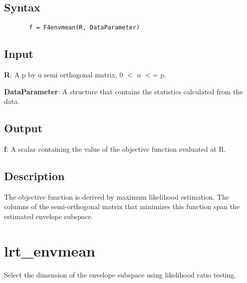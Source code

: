\documentclass[a4paper,11pt,openany]{memoir}
\begin{document}
\subsection*{Syntax}


\begin{verbatim}       f = F4envmean(R, DataParameter)\end{verbatim}
    

\subsection*{Input}

\begin{par}
\textbf{R}: A p by u semi orthogonal matrix, 0 \ensuremath{<} u \ensuremath{<}= p.
\end{par} \vspace{1em}
\begin{par}
\textbf{DataParameter}: A structure that contains the statistics calculated from the data.
\end{par} \vspace{1em}


\subsection*{Output}

\begin{par}
\textbf{f}: A scalar containing the value of the objective function evaluated at R.
\end{par} \vspace{1em}


\subsection*{Description}

\begin{par}
The objective function is derived by maximum likelihood estimation. The columns of the semi-orthogonal matrix that minimizes this function span the estimated envelope subspace.
\end{par} \vspace{1em}

\newpage

\rmfamily
\color{black}\section{lrt\_envmean}

\begin{par}
Select the dimension of the envelope subspace using likelihood ratio testing.
\end{par} \vspace{1em}
\end{document}
